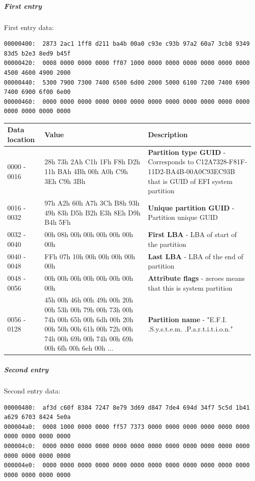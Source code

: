 \documentclass[a4paper,11pt]{article}
\theoremstyle{mytheor}
\begin{document}
\subparagraph{First entry} First entry data:
\begin{lstlisting}
00000400:  2873 2ac1 1ff8 d211 ba4b 00a0 c93e c93b 97a2 60a7 3cb8 9349 83d5 b2e3 8ed9 b45f
00000420:  0008 0000 0000 0000 ff07 1000 0000 0000 0000 0000 0000 0000 4500 4600 4900 2000
00000440:  5300 7900 7300 7400 6500 6d00 2000 5000 6100 7200 7400 6900 7400 6900 6f00 6e00
00000460:  0000 0000 0000 0000 0000 0000 0000 0000 0000 0000 0000 0000 0000 0000 0000 0000
\end{lstlisting}

\begin{longtable}{| p{3cm} | p{2cm} | p{10cm} |} \hline
  Data location & Value & Description\\ \hline
  0000 - 0016 & 28h 73h 2Ah C1h 1Fh F8h D2h 11h BAh 4Bh 00h A0h C9h 3Eh C9h 3Bh  & \textbf{Partition type GUID} - Corresponds to C12A7328-F81F-11D2-BA4B-00A0C93EC93B that is GUID of EFI system partition\\ \hline
  0016 - 0032 & 97h A2h 60h A7h 3Ch B8h 93h 49h 83h D5h B2h E3h 8Eh D9h B4h 5Fh & \textbf{Unique partition GUID} - Partition unique GUID\\ \hline
  0032 - 0040 & 00h 08h 00h 00h 00h 00h 00h 00h & \textbf{First LBA} - LBA of start of the partition\\ \hline
  0040 - 0048 & FFh 07h 10h 00h 00h 00h 00h 00h & \textbf{Last LBA} - LBA of the end of partition\\ \hline
  0048 - 0056 & 00h 00h 00h 00h 00h 00h 00h 00h & \textbf{Attribute flags} - zeroes means that this is system partition\\ \hline
  0056 - 0128 & 45h 00h 46h 00h 49h 00h 20h 00h 53h 00h 79h 00h 73h 00h 74h 00h 65h 00h 6dh 00h 20h 00h 50h 00h 61h 00h 72h 00h 74h 00h 69h 00h 74h 00h 69h 00h 6fh 00h 6eh 00h ... & \textbf{Partition name} - "E.F.I. .S.y.s.t.e.m. .P.a.r.t.i.t.i.o.n."\\ \hline
\end{longtable}

\subparagraph{Second entry} Second entry data:

\begin{lstlisting}
00000480:  af3d c60f 8384 7247 8e79 3d69 d847 7de4 694d 34f7 5c5d 1b41 a629 6703 8424 5e0a
000004a0:  0008 1000 0000 0000 ff57 7373 0000 0000 0000 0000 0000 0000 0000 0000 0000 0000
000004c0:  0000 0000 0000 0000 0000 0000 0000 0000 0000 0000 0000 0000 0000 0000 0000 0000
000004e0:  0000 0000 0000 0000 0000 0000 0000 0000 0000 0000 0000 0000 0000 0000 0000 0000
\end{lstlisting}
\end{document}
